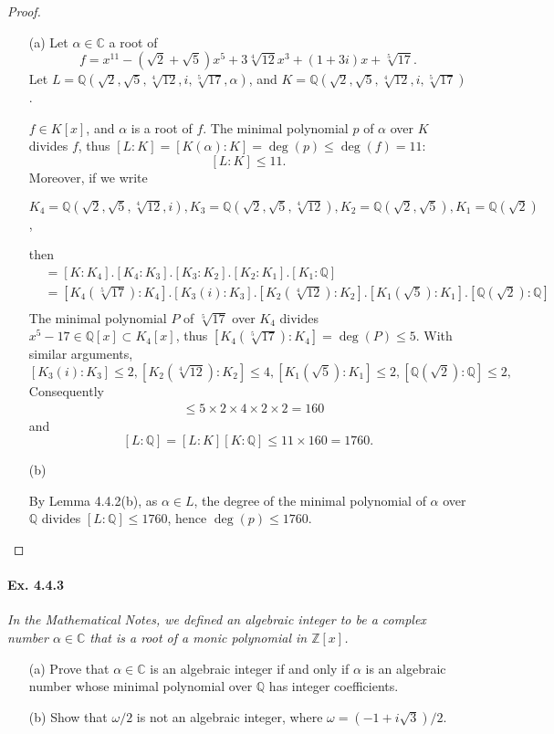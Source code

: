 \documentclass[11pt,a4paper]{article}
\newcommand{\Q}{\mathbb{Q}}
\newcommand{\Z}{\mathbb{Z}}
\newcommand{\C}{\mathbb{C}}
\begin{document}
\begin{proof}
\begin{enumerate}
\item[(a)]
Let $\alpha \in \C$ a root of 
$$f = x^{11}-(\sqrt{2}+\sqrt{5}) x^5+3\sqrt[4]{12}x^3+(1+3i) x +\sqrt[5]{17}.$$
Let $L = \Q(\sqrt{2},\sqrt{5},\sqrt[4]{12},i,\sqrt[5]{17},\alpha)$, and $K = \Q(\sqrt{2},\sqrt{5},\sqrt[4]{12},i,\sqrt[5]{17})$.

$f \in K[x]$, and $\alpha$ is a root of $f$. The minimal polynomial $p$ of $\alpha$ over $K$ divides $f$, thus  $[L : K] = [K(\alpha) : K] =\deg(p) \leq \deg(f)=11$:
$$[L : K]\leq 11.$$
Moreover, if we write 

$K_4  =  \Q(\sqrt{2},\sqrt{5},\sqrt[4]{12},i), K_3 =  \Q(\sqrt{2},\sqrt{5},\sqrt[4]{12}),K_2 =  \Q(\sqrt{2},\sqrt{5}), K_1 = \Q(\sqrt{2})$,

then
\begin{align*}
[K : \Q] &= [K : K_4] .[K_4:K_3] .[K_3:K_2] .[K_2:K_1] .[K_1:\Q]\\
&  = [K_4( \sqrt[5]{17}): K_4]. [K_3(i):K_3]. [K_2(\sqrt[4]{12}):K_2] .[K_1(\sqrt{5}):K_1]. [\Q(\sqrt{2}):\Q]\\
\end{align*}
 The minimal polynomial $P$ of $ \sqrt[5]{17}$ over $K_4$ divides $x^5-17 \in \Q[x] \subset K_4[x]$, thus $[K_4(\sqrt[5]{17}) : K_4] = \deg(P) \leq 5$. With similar arguments, 
 $$[K_3(i):K_3] \leq 2, [K_2(\sqrt[4]{12}):K_2] \leq 4, [K_1(\sqrt{5}):K_1] \leq 2,[\Q(\sqrt{2}):\Q] \leq 2,$$
Consequently
\begin{align*}
[K : \Q] &\leq 5\times 2 \times 4 \times 2 \times 2 = 160
\end{align*}
and
 $$[L : \Q] = [L:K][K:\Q] \leq 11 \times 160 = 1760.$$

\item[(b)]

By Lemma 4.4.2(b),  as $\alpha \in L$, the degree of the minimal polynomial of  $\alpha$ over $\Q$ divides ${[L:\Q] \leq 1760}$, hence $\deg(p) \leq 1760$.
\end{enumerate}
\end{proof}

\paragraph{Ex. 4.4.3}

{\it In the Mathematical Notes, we defined an algebraic integer to be a complex number $\alpha \in \C$ that is a root of a monic polynomial in $\Z[x]$.
\begin{enumerate}
\item[(a)] Prove that $\alpha \in \C$ is an algebraic integer if and only if $\alpha$ is an algebraic number whose minimal polynomial over $\Q$ has integer coefficients.
\item[(b)] Show that $\omega/2$ is not an algebraic integer, where $\omega = (-1+i\sqrt{3})/2$.
\end{enumerate}
}
\end{document}
